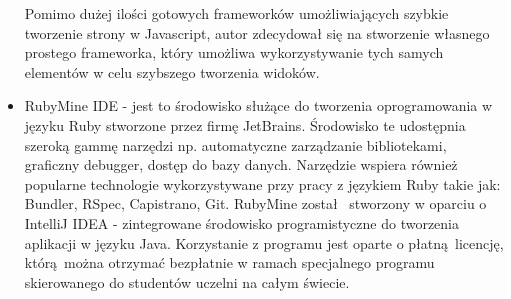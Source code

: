 \begin{itemize}
 Pomimo dużej ilości gotowych frameworków umożliwiających szybkie tworzenie strony w Javascript, autor zdecydował się na stworzenie własnego prostego frameworka, który umożliwa wykorzystywanie tych samych elementów w celu szybszego tworzenia widoków.
\item RubyMine IDE - jest to środowisko służące do tworzenia oprogramowania w języku Ruby stworzone przez firmę JetBrains. Środowisko te udostępnia szeroką gammę narzędzi np. automatyczne zarządzanie bibliotekami, graficzny debugger, dostęp do bazy danych. Narzędzie wspiera również popularne technologie wykorzystywane przy pracy z językiem Ruby takie jak: Bundler, RSpec, Capistrano, Git. RubyMine został  stworzony w oparciu o IntelliJ IDEA - zintegrowane środowisko programistyczne do tworzenia aplikacji w języku Java. Korzystanie z programu jest oparte o płatną licencję, którą można otrzymać bezpłatnie w ramach specjalnego programu skierowanego do studentów uczelni na całym świecie.
\end{itemize}

